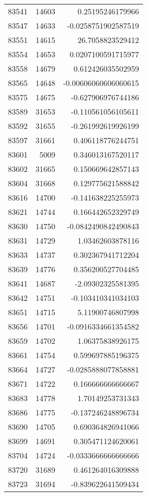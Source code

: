 \begin{tabular}{r | r | r}
83541 & 14603 & 0.25195246179966 \\
83547 & 14633 & -0.0258751902587519 \\
83551 & 14615 & 26.7058823529412 \\
83554 & 14653 & 0.0207100591715977 \\
83558 & 14679 & 0.612426035502959 \\
83565 & 14648 & -0.00606060606060615 \\
83575 & 14675 & -0.627906976744186 \\
83589 & 31653 & -0.110561056105611 \\
83592 & 31655 & -0.261992619926199 \\
83597 & 31661 & 0.406118776244751 \\
83601 & 5009 & 0.346013167520117 \\
83602 & 31665 & 0.150669642857143 \\
83604 & 31668 & 0.129775621588842 \\
83616 & 14700 & -0.141638225255973 \\
83621 & 14744 & 0.166442652329749 \\
83630 & 14750 & -0.0842490842490843 \\
83631 & 14729 & 1.03462603878116 \\
83633 & 14737 & 0.302367941712204 \\
83639 & 14776 & 0.356200527704485 \\
83641 & 14687 & -2.09302325581395 \\
83642 & 14751 & -0.103410341034103 \\
83651 & 14715 & 5.11900746807998 \\
83656 & 14701 & -0.0916334661354582 \\
83659 & 14702 & 1.06375838926175 \\
83661 & 14754 & 0.599697885196375 \\
83664 & 14727 & -0.0285888077858881 \\
83671 & 14722 & 0.166666666666667 \\
83683 & 14778 & 1.70149253731343 \\
83686 & 14775 & -0.137246248896734 \\
83690 & 14705 & 0.690364826941066 \\
83699 & 14691 & 0.305471124620061 \\
83704 & 14724 & -0.0333666666666666 \\
83720 & 31689 & 0.461264016309888 \\
83723 & 31694 & -0.839622641509434 \\

\end{tabular}
